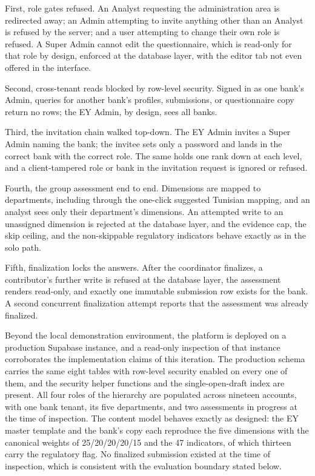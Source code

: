 First, role gates refused. An Analyst requesting the administration area is redirected away; an Admin attempting to invite anything other than an Analyst is refused by the server; and a user attempting to change their own role is refused. A Super Admin cannot edit the questionnaire, which is read-only for that role by design, enforced at the database layer, with the editor tab not even offered in the interface.

Second, cross-tenant reads blocked by row-level security. Signed in as one bank's Admin, queries for another bank's profiles, submissions, or questionnaire copy return no rows; the EY Admin, by design, sees all banks.

Third, the invitation chain walked top-down. The EY Admin invites a Super Admin naming the bank; the invitee sets only a password and lands in the correct bank with the correct role. The same holds one rank down at each level, and a client-tampered role or bank in the invitation request is ignored or refused.

Fourth, the group assessment end to end. Dimensions are mapped to departments, including through the one-click suggested Tunisian mapping, and an analyst sees only their department's dimensions. An attempted write to an unassigned dimension is rejected at the database layer, and the evidence cap, the skip ceiling, and the non-skippable regulatory indicators behave exactly as in the solo path.

Fifth, finalization locks the answers. After the coordinator finalizes, a contributor's further write is refused at the database layer, the assessment renders read-only, and exactly one immutable submission row exists for the bank. A second concurrent finalization attempt reports that the assessment was already finalized.

Beyond the local demonstration environment, the platform is deployed on a production Supabase instance, and a read-only inspection of that instance corroborates the implementation claims of this iteration. The production schema carries the same eight tables with row-level security enabled on every one of them, and the security helper functions and the single-open-draft index are present. All four roles of the hierarchy are populated across nineteen accounts, with one bank tenant, its five departments, and two assessments in progress at the time of inspection. The content model behaves exactly as designed: the EY master template and the bank's copy each reproduce the five dimensions with the canonical weights of 25/20/20/20/15 and the 47 indicators, of which thirteen carry the regulatory flag. No finalized submission existed at the time of inspection, which is consistent with the evaluation boundary stated below.

